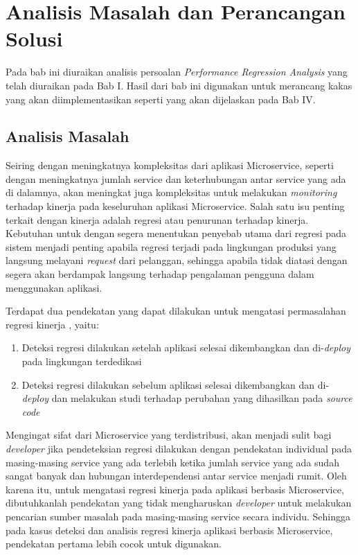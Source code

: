 \chapter{Analisis Masalah dan Perancangan Solusi}
Pada bab ini diuraikan analisis persoalan \textit{Performance Regression Analysis} yang telah diuraikan pada Bab I. Hasil dari bab ini digunakan untuk merancang kakas yang akan diimplementasikan seperti yang akan dijelaskan pada Bab IV. 


\section{Analisis Masalah}
\label{analisis-masalah}

Seiring dengan meningkatnya kompleksitas dari aplikasi Microservice, seperti dengan meningkatnya jumlah service dan keterhubungan antar service yang ada di dalamnya, akan meningkat juga kompleksitas untuk melakukan \textit{monitoring} terhadap kinerja pada keseluruhan aplikasi Microservice. Salah satu isu penting terkait dengan kinerja adalah regresi atau penurunan terhadap kinerja. Kebutuhan untuk dengan segera menentukan penyebab utama dari regresi pada sistem menjadi penting apabila regresi terjadi pada lingkungan produksi yang langsung melayani \textit{request} dari pelanggan, sehingga apabila tidak diatasi dengan segera akan berdampak langsung terhadap pengalaman pengguna dalam menggunakan aplikasi. 

Terdapat dua pendekatan yang dapat dilakukan untuk mengatasi permasalahan regresi kinerja \citep{regression-detection}, yaitu:
\begin{enumerate}
	\item Deteksi regresi dilakukan setelah aplikasi selesai dikembangkan dan di-\textit{deploy} pada lingkungan terdedikasi
	\item Deteksi regresi dilakukan sebelum aplikasi selesai dikembangkan dan di-\textit{deploy} dan melakukan studi terhadap perubahan yang dihasilkan pada \textit{source code}
\end{enumerate}  

Mengingat sifat dari Microservice yang terdistribusi, akan menjadi sulit bagi \textit{developer} jika pendeteksian regresi dilakukan dengan pendekatan individual pada masing-masing service yang ada terlebih ketika jumlah service yang ada sudah sangat banyak dan hubungan interdependensi antar service menjadi rumit. Oleh karena itu, untuk mengatasi regresi kinerja pada aplikasi berbasis Microservice, dibutuhkanlah pendekatan yang tidak mengharuskan \textit{developer} untuk melakukan pencarian sumber masalah pada masing-masing service secara individu. Sehingga pada kasus deteksi dan analisis regresi kinerja aplikasi berbasis Microservice, pendekatan pertama lebih cocok untuk digunakan.

